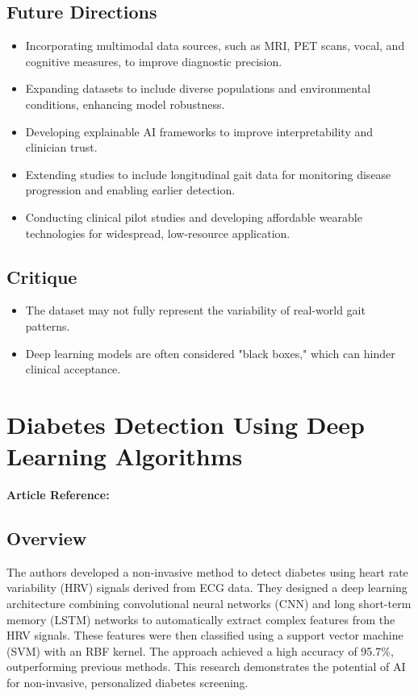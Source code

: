 \subsection*{Future Directions}
\begin{itemize}
    \item Incorporating multimodal data sources, such as MRI, PET scans, vocal, and cognitive measures, to improve diagnostic precision.
    \item Expanding datasets to include diverse populations and environmental conditions, enhancing model robustness.
    \item Developing explainable AI frameworks to improve interpretability and clinician trust.
    \item Extending studies to include longitudinal gait data for monitoring disease progression and enabling earlier detection.
    \item Conducting clinical pilot studies and developing affordable wearable technologies for widespread, low-resource application.
\end{itemize}

\subsection*{Critique}
\begin{itemize}
    \item The dataset may not fully represent the variability of real-world gait patterns.    
    \item Deep learning models are often considered "black boxes," which can hinder clinical acceptance.
\end{itemize}

\section{Diabetes Detection Using Deep Learning Algorithms}
\textbf{Article Reference:} \cite{swapnaDiabetesDetectionUsing2018}

\subsection*{Overview}
The authors developed a non-invasive method to detect diabetes using heart rate variability (HRV) signals derived from ECG data. They designed a deep learning architecture combining convolutional neural networks (CNN) and long short-term memory (LSTM) networks to automatically extract complex features from the HRV signals. These features were then classified using a support vector machine (SVM) with an RBF kernel. The approach achieved a high accuracy of 95.7\%, outperforming previous methods. This research demonstrates the potential of AI for non-invasive, personalized diabetes screening.

